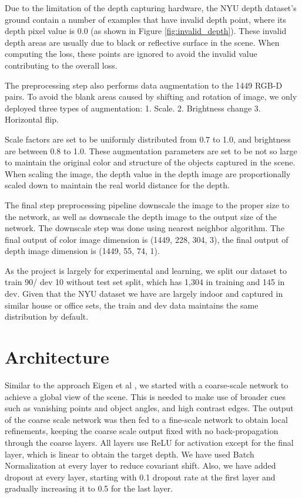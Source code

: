 \documentclass{article}
\begin{document}
    Due to the limitation of the depth capturing hardware, the NYU depth dataset’s ground contain a number of examples that have invalid depth point, where its depth pixel value is 0.0 (as shown in Figure \ref{fig:invalid_depth}). These invalid depth areas are usually due to black or reflective surface in the scene. When computing the loss, these points are ignored to avoid the invalid value contributing to the overall loss.
    
    The preprocessing step also performs data augmentation to the 1449 RGB-D pairs. To avoid the blank areas caused by shifting and rotation of image, we only deployed three types of augmentation: 1. Scale. 2. Brightness change 3. Horizontal flip. 

    Scale factors are set to be uniformly distributed from 0.7 to 1.0, and brightness are between 0.8 to 1.0. These augmentation parameters are set to be not so large to maintain the original color and structure of the objects captured in the scene. When scaling the image, the depth value in the depth image are proportionally scaled down to maintain the real world distance for the depth.

    The final step preprocessing pipeline downscale the image to the proper size to the network, as well as downscale the depth image to the output size of the network. The downscale step was done using nearest neighbor algorithm. The final output of color image dimension is (1449, 228, 304, 3), the final output of depth image dimension is (1449, 55, 74, 1).
    
    As the project is largely for experimental and learning, we split our dataset to train 90/ dev 10 without test set split, which has 1,304 in training and 145 in dev. Given that the NYU dataset we have are largely indoor and captured in similar house or office sets, the train and dev data maintains the same distribution by default.

\section{Architecture}
    Similar to the approach Eigen et al \cite{nips-1}, we started with a coarse-scale network to achieve a global view of the scene. This is needed to make use of broader cues such as vanishing points and object angles, and high contrast edges. The output of the coarse scale network was then fed to a fine-scale network to obtain local refinements, keeping the coarse scale output fixed with no back-propagation through the coarse layers. All layers use ReLU for activation except for the final layer, which is linear to obtain the target depth. We have used Batch Normalization at every layer to reduce covariant shift. Also, we have added dropout at every layer, starting with 0.1 dropout rate at the first layer and gradually increasing it to 0.5 for the last layer. 
    
\end{document}
